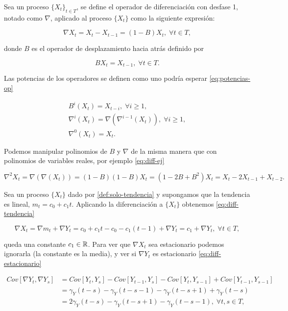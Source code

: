 \begin{definicion}

Sea un proceso $\{X_t\}_{t \in T}$, se define el operador de diferenciación con desfase 1, notado como $\nabla$, aplicado al proceso $\{X_t\}$ como la siguiente expresión:

$$\nabla X_t = X_t - X_{t - 1} = (1 - B)X_t, \; \forall t \in T,$$

donde $B$ es el operador de desplazamiento hacia atrás definido por

$$BX_t = X_{t-1}, \; \forall t \in T.$$
\label{def:operador-diff}
\end{definicion}

Las potencias de los operadores se definen como uno podría esperar \eqref{eq:potencias-op}

\begin{gather}
  B^i(X_t) = X_{t-i}, \; \forall i \geq 1, \\
  \nabla^i(X_t) = \nabla(\nabla^{i-1}(X_t)), \; \forall i \geq 1, \\
  \nabla^0(X_t) = X_t.
\label{eq:potencias-op}
\end{gather}

Podemos manipular polinomios de $B$ y $\nabla$ de la misma manera que con polinomios de variables reales, por ejemplo \eqref{eq:diff-ej}

\begin{equation}
  \nabla^2X_t = \nabla(\nabla(X_t)) = (1-B)(1-B)X_t = (1 - 2B + B^2)X_t = X_t - 2X_{t-1} + X_{t-2}.
  \label{eq:diff-ej}
\end{equation}

Sea un proceso $\{X_t\}$ dado por \autoref{def:solo-tendencia} y supongamos que la tendencia es lineal, $m_t = c_0 + c_1t$. Aplicando la diferenciación a $\{X_t\}$ obtenemos \eqref{eq:diff-tendencia}

\begin{equation}
  \nabla X_t = \nabla m_t + \nabla Y_t = c_0 + c_1 t - c_0 - c_1(t - 1) + \nabla Y_t = c_1 + \nabla Y_t, \; \forall t \in T,
  \label{eq:diff-tendencia}
\end{equation}

queda una constante $c_1 \in \mathbb{R}$. Para ver que $\nabla X_t$ sea estacionario podemos ignorarla (la constante es la media), y ver si $\nabla Y_t$ es estacionario \eqref{eq:diff-estacionario}

\begin{equation}
  \begin{aligned}
  Cov[\nabla Y_t, \nabla Y_s] & = Cov[Y_t, Y_s] - Cov[Y_{t-1}, Y_s] - Cov[Y_t, Y_{s-1}] + Cov[Y_{t-1}, Y_{s-1}] \\
  & = \gamma_Y(t - s) - \gamma_Y(t - s - 1) - \gamma_Y(t - s + 1) + \gamma_Y(t - s) \\
  & = 2\gamma_Y(t - s) - \gamma_Y(t - s + 1) - \gamma_Y(t - s - 1), \; \forall t,s \in T,
  \end{aligned}
  \label{eq:diff-estacionario}
\end{equation}

